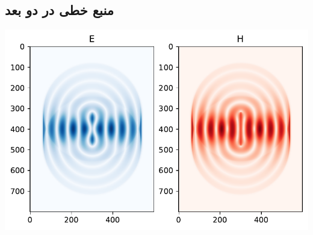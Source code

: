\documentclass[12pt,a4paper]{article}
\begin{document}
	\subsection{منبع خطی در دو بعد}
	\begin{center}
		\includegraphics{line2d}
	\end{center}
\end{document}
